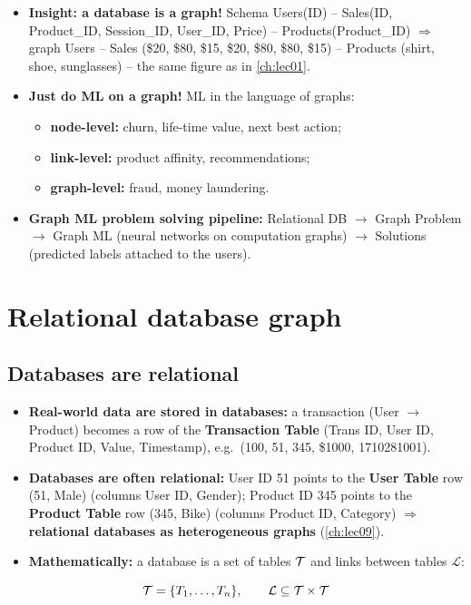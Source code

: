 \begin{itemize}
  \item \textbf{Insight: a database is a graph!} Schema Users(ID) -- Sales(ID,
    Product\_ID, Session\_ID, User\_ID, Price) -- Products(Product\_ID) $\Rightarrow$
    graph Users -- Sales (\$20, \$80, \$15, \$20, \$80, \$80, \$15) -- Products (shirt,
    shoe, sunglasses) -- the same figure as in \cref{ch:lec01}.
  \item \textbf{Just do ML on a graph!} ML in the language of graphs:
    \begin{itemize}
      \item \textbf{node-level:} churn, life-time value, next best action;
      \item \textbf{link-level:} product affinity, recommendations;
      \item \textbf{graph-level:} fraud, money laundering.
    \end{itemize}
  \item \textbf{Graph ML problem solving pipeline:} Relational DB $\to$ Graph Problem
    $\to$ Graph ML (neural networks on computation graphs) $\to$ Solutions (predicted
    labels attached to the users).
\end{itemize}

\section{Relational database graph}\label{sec:lec12-rdbgraph}

\subsection{Databases are relational}\label{sec:lec12-relational}

\begin{itemize}
  \item \textbf{Real-world data are stored in databases:} a transaction (User $\to$
    Product) becomes a row of the \textbf{Transaction Table} (Trans ID, User ID, Product
    ID, Value, Timestamp), e.g.\ (100, 51, 345, \$1000, 1710281001).
  \item \textbf{Databases are often relational:} User ID 51 points to the \textbf{User
    Table} row (51, Male) (columns User ID, Gender); Product ID 345 points to the
    \textbf{Product Table} row (345, Bike) (columns Product ID, Category)
    $\Rightarrow$ \textbf{relational databases as heterogeneous graphs}
    (\cref{ch:lec09}).
  \item \textbf{Mathematically:} a database is a set of tables $\mathcal{T}$ and links between
    tables $\mathcal{L}$:
\end{itemize}
\begin{equation}\label{eq:lec12-db}
  \mathcal{T}=\{T_1,\dots,T_n\},\qquad \mathcal{L}\subseteq\mathcal{T}\times\mathcal{T}
\end{equation}

